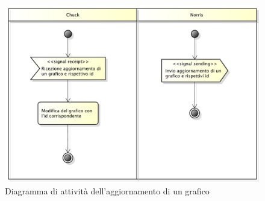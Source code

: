 \begin{itemize}
\begin{figure}[H]
        	\includegraphics[width=\textwidth]{SpecificaTecnica/Pics/Chuck/AggiornamentiGrafico.pdf}
        	\caption{Diagramma di attività dell'aggiornamento di un grafico}
    		\end{figure}
        \end{itemize}
    

